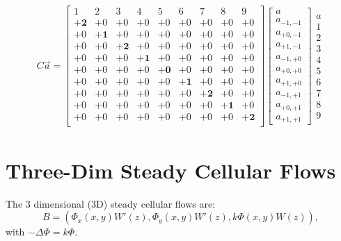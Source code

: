 \documentclass{article}
\newcommand{\be}{\begin{equation}}
\newcommand{\ee}{\end{equation}}
\newcommand{\0}{\mathbf{0}}
\newcommand{\1}{\mathbf{1}}
\newcommand{\2}{\mathbf{2}}
\newcommand{\3}{\mathbf{3}}
\newcommand{\4}{\mathbf{4}}
\newcommand{\5}{\mathbf{5}}
\newcommand{\6}{\mathbf{6}}
\newcommand{\7}{\mathbf{7}}
\newcommand{\8}{\mathbf{8}}
\begin{document}
\begin{small}
\setlength\arraycolsep{1.3pt}  
\begin{align*}  
  C\vec{a}=  
  \left[
   \begin{array}{rrrrrrrrr}  
     1& 2& 3& 4& 5& 6& 7& 8& 9\\    %
    +\2&+0&+0&+0&+0&+0&+0&+0&+0\\    %
    +0&+\1&+0&+0&+0&+0&+0&+0&+0\\    %
    +0&+0&+\2&+0&+0&+0&+0&+0&+0\\    %
    +0&+0&+0&+\1&+0&+0&+0&+0&+0\\    %
    +0&+0&+0&+0&+\0&+0&+0&+0&+0\\    %
    +0&+0&+0&+0&+0&+\1&+0&+0&+0\\    %
    +0&+0&+0&+0&+0&+0&+\2&+0&+0\\    %
    +0&+0&+0&+0&+0&+0&+0&+\1&+0\\    %
    +0&+0&+0&+0&+0&+0&+0&+0&+\2\\    %
   \end{array}
  \right]
  \left[
  \begin{array}{c}  
    a\\a_{-1,-1}\\a_{+0,-1}\\a_{+1,-1}\\
       a_{-1,+0}\\a_{+0,+0}\\a_{+1,+0}\\
       a_{-1,+1}\\a_{+0,+1}\\a_{+1,+1}
  \end{array}
  \right]
  \begin{array}{c}  
    a\\1\\2\\3\\4\\5\\
    6\\7\\8\\9
  \end{array}    
\end{align*}
\end{small}  
\newpage

\section{Three-Dim Steady Cellular Flows}
The 3 dimensional (3D) steady cellular flows are:
\be
B =
(\Phi_x(x,y)W'(z),\Phi_y(x,y)W'(z),k\Phi(x,y)W(z)), \label{3dcell}
\ee
with $-\Delta \Phi = k \Phi.$   
\medskip
\end{document}
